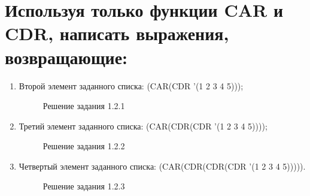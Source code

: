 \documentclass[12pt]{report}
\begin{document}
\section{Используя только функции CAR и CDR, написать выражения, возвращающие:}

\begin{enumerate}
	\item Второй элемент заданного списка: (CAR(CDR '(1 2 3 4 5)));
	\begin{figure}[!h]
		\caption{Решение задания 1.2.1}
	\end{figure}
	\item Третий элемент заданного списка: (CAR(CDR(CDR '(1 2 3 4 5))));
	\begin{figure}[!h]
		\caption{Решение задания 1.2.2}
	\end{figure}
	\item Четвертый элемент заданного списка: (CAR(CDR(CDR(CDR '(1 2 3 4 5))))).
	\begin{figure}[!h]
		\caption{Решение задания 1.2.3}
	\end{figure}	
\end{enumerate}
\end{document}
